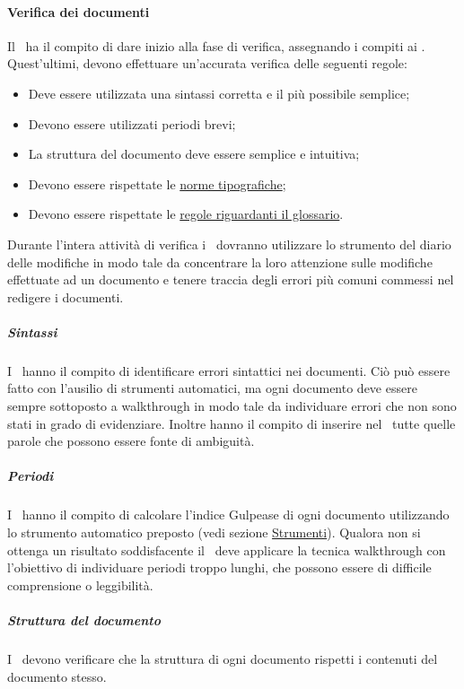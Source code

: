 \documentclass[../NormeProgetto.tex]{subfiles}
\begin{document}
	\paragraph{Verifica dei documenti}
	Il \responsabilediprogetto\ ha il compito di dare inizio alla fase di verifica, assegnando i compiti ai \verificatori. Quest'ultimi, devono effettuare un'accurata verifica delle seguenti regole:
	\begin{itemize}
		\item Deve essere utilizzata una sintassi corretta e il più possibile semplice;
		\item Devono essere utilizzati periodi brevi;
		\item La struttura del documento deve essere semplice e intuitiva;
		\item Devono essere rispettate le  \hyperref[sec:Norme tipografiche]{norme tipografiche};
		\item Devono essere rispettate le \hyperref[sec:Glossario]{regole riguardanti il glossario}.
	\end{itemize}
	Durante l'intera attività di verifica i \verificatori\ dovranno utilizzare lo strumento del diario delle modifiche in modo tale da concentrare la loro attenzione sulle modifiche effettuate ad un documento e tenere traccia degli errori più comuni commessi nel redigere i documenti.
		\subparagraph{Sintassi}
		I \verificatori\ hanno il compito di identificare errori sintattici nei documenti. Ciò può essere fatto con l'ausilio di strumenti automatici, ma ogni documento deve essere sempre sottoposto a walkthrough in modo tale da individuare errori che non sono stati in grado di evidenziare. Inoltre hanno il compito di inserire nel \glossario\ tutte quelle parole che possono essere fonte di ambiguità.
		\subparagraph{Periodi}
		I \verificatori\ hanno il compito di calcolare l'indice Gulpease di ogni documento utilizzando lo strumento automatico preposto (vedi sezione \hyperref[sec:Strumenti]{Strumenti}). Qualora non si ottenga un risultato soddisfacente il \verificatore\ deve applicare la tecnica walkthrough con l'obiettivo di individuare periodi troppo lunghi, che possono essere di difficile comprensione o leggibilità.
		\subparagraph{Struttura del documento}
		I \verificatori\ devono verificare che la struttura di ogni documento rispetti i contenuti del documento stesso.
\end{document}
